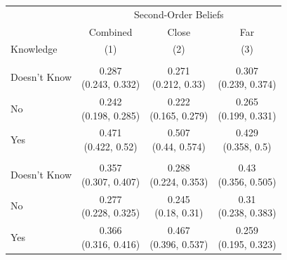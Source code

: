 
\centering

\centering
\begin{tabular}[t]{lccc}
\toprule
\multicolumn{1}{c}{ } & \multicolumn{3}{c}{Second-Order Beliefs} \\
\cmidrule(l{3pt}r{3pt}){2-4}
\multicolumn{1}{c}{ } & \multicolumn{1}{c}{Combined} & \multicolumn{1}{c}{Close} & \multicolumn{1}{c}{Far} \\
Knowledge & (1) & (2) & (3)\\
\midrule
\addlinespace[0.3em]
\hline
\multicolumn{4}{l}{\textbf{Bracelet}}\\
\hline
\hspace{1em}Doesn't Know & \makecell[c]{0.287\\(0.243, 0.332)} & \makecell[c]{0.271\\(0.212, 0.33)} & \makecell[c]{0.307\\(0.239, 0.374)}\\
\hspace{1em}No & \makecell[c]{0.242\\(0.198, 0.285)} & \makecell[c]{0.222\\(0.165, 0.279)} & \makecell[c]{0.265\\(0.199, 0.331)}\\
\hspace{1em}Yes & \makecell[c]{0.471\\(0.422, 0.52)} & \makecell[c]{0.507\\(0.44, 0.574)} & \makecell[c]{0.429\\(0.358, 0.5)}\\
\addlinespace[0.3em]
\hline
\multicolumn{4}{l}{\textbf{Calendar}}\\
\hline
\hspace{1em}Doesn't Know & \makecell[c]{0.357\\(0.307, 0.407)} & \makecell[c]{0.288\\(0.224, 0.353)} & \makecell[c]{0.43\\(0.356, 0.505)}\\
\hspace{1em}No & \makecell[c]{0.277\\(0.228, 0.325)} & \makecell[c]{0.245\\(0.18, 0.31)} & \makecell[c]{0.31\\(0.238, 0.383)}\\
\hspace{1em}Yes & \makecell[c]{0.366\\(0.316, 0.416)} & \makecell[c]{0.467\\(0.396, 0.537)} & \makecell[c]{0.259\\(0.195, 0.323)}\\

\end{tabular}
